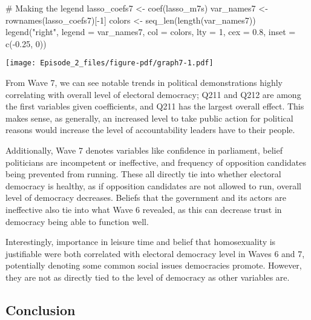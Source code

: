 \documentclass[
  letterpaper,
  DIV=11,
  numbers=noendperiod]{scrartcl}
\newenvironment{Shaded}{\begin{snugshade}}{\end{snugshade}}
\newcommand{\AttributeTok}[1]{\textcolor[rgb]{0.40,0.45,0.13}{#1}}
\newcommand{\CommentTok}[1]{\textcolor[rgb]{0.37,0.37,0.37}{#1}}
\newcommand{\DecValTok}[1]{\textcolor[rgb]{0.68,0.00,0.00}{#1}}
\newcommand{\FloatTok}[1]{\textcolor[rgb]{0.68,0.00,0.00}{#1}}
\newcommand{\FunctionTok}[1]{\textcolor[rgb]{0.28,0.35,0.67}{#1}}
\newcommand{\NormalTok}[1]{\textcolor[rgb]{0.00,0.23,0.31}{#1}}
\newcommand{\OtherTok}[1]{\textcolor[rgb]{0.00,0.23,0.31}{#1}}
\newcommand{\SpecialCharTok}[1]{\textcolor[rgb]{0.37,0.37,0.37}{#1}}
\newcommand{\StringTok}[1]{\textcolor[rgb]{0.13,0.47,0.30}{#1}}
\begin{document}
\begin{Shaded}
\begin{Highlighting}[]
\CommentTok{\# Making the legend}
\NormalTok{lasso\_coefs7 }\OtherTok{\textless{}{-}} \FunctionTok{coef}\NormalTok{(lasso\_m7s)}
\NormalTok{var\_names7 }\OtherTok{\textless{}{-}} \FunctionTok{rownames}\NormalTok{(lasso\_coefs7)[}\SpecialCharTok{{-}}\DecValTok{1}\NormalTok{]}
\NormalTok{colors }\OtherTok{\textless{}{-}} \FunctionTok{seq\_len}\NormalTok{(}\FunctionTok{length}\NormalTok{(var\_names7))}
\FunctionTok{legend}\NormalTok{(}\StringTok{"right"}\NormalTok{, }\AttributeTok{legend =}\NormalTok{ var\_names7, }\AttributeTok{col =}\NormalTok{ colors, }\AttributeTok{lty =} \DecValTok{1}\NormalTok{, }\AttributeTok{cex =} \FloatTok{0.8}\NormalTok{, }\AttributeTok{inset =} \FunctionTok{c}\NormalTok{(}\SpecialCharTok{{-}}\FloatTok{0.25}\NormalTok{, }\DecValTok{0}\NormalTok{))}
\end{Highlighting}
\end{Shaded}

\texttt{[image: Episode\_2\_files/figure-pdf/graph7-1.pdf]}

From Wave 7, we can see notable trends in political demonstrations
highly correlating with overall level of electoral democracy; Q211 and
Q212 are among the first variables given coefficients, and Q211 has the
largest overall effect. This makes sense, as generally, an increased
level to take public action for political reasons would increase the
level of accountability leaders have to their people.

Additionally, Wave 7 denotes variables like confidence in parliament,
belief politicians are incompetent or ineffective, and frequency of
opposition candidates being prevented from running. These all directly
tie into whether electoral democracy is healthy, as if opposition
candidates are not allowed to run, overall level of democracy decreases.
Beliefs that the government and its actors are ineffective also tie into
what Wave 6 revealed, as this can decrease trust in democracy being able
to function well.

Interestingly, importance in leisure time and belief that homosexuality
is justifiable were both correlated with electoral democracy level in
Waves 6 and 7, potentially denoting some common social issues
democracies promote. However, they are not as directly tied to the level
of democracy as other variables are.

\subsection{Conclusion}\label{conclusion}
\end{document}
